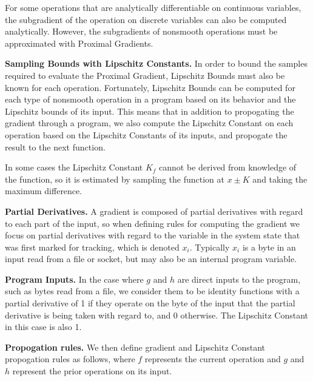 For some operations that are analytically differentiable on continuous variables, the subgradient of the operation on discrete variables can also be computed analytically. However, the subgradients of nonsmooth operations must be approximated with Proximal Gradients. 

\noindent \textbf{Sampling Bounds with Lipschitz Constants.} In order to bound the samples required to evaluate the Proximal Gradient, Lipschitz Bounds must also be known for each operation. Fortunately, Lipschitz Bounds can be computed for each type of nonsmooth operation in a program based on its behavior and the Lipschitz bounds of its input. This means that in addition to propogating the gradient through a program, we also compute the Lipschitz Constant on each operation based on the Lipschitz Constants of its inputs, and propogate the result to the next function.

In some cases the Lipschitz Constant $K_f$ cannot be derived from knowledge of the function, so it is estimated by sampling the function at $x \pm K$ and taking the maximum difference.

\noindent \textbf{Partial Derivatives.} A gradient is composed of partial derivatives with regard to each part of the input, so when defining rules for computing the gradient we focus on partial derivatives with regard to the variable in the system state that was first marked for tracking, which is denoted $x_i$. Typically $x_i$ is a byte in an input read from a file or socket, but may also be an internal program variable.


\noindent \textbf{Program Inputs.} In the case where $g$ and $h$ are direct inputs to the program, such as bytes read from a file, we consider them to be identity functions with a partial derivative of 1 if they operate on the byte of the input that the partial derivative is being taken with regard to, and 0 otherwise. The Lipschitz Constant in this case is also 1.

\noindent \textbf{Propogation rules.} We then define gradient and Lipschitz Constant propogation rules as follows, where $f$ represents the current operation and $g$ and $h$ represent the prior operations on its input.

